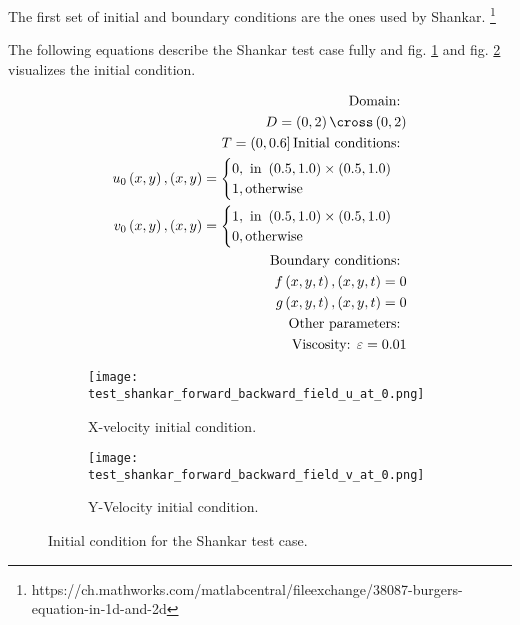 
The first set of initial and boundary conditions are the ones used by Shankar. \footnote{https://ch.mathworks.com/matlabcentral/fileexchange/38087-burgers-equation-in-1d-and-2d}

The following equations describe the Shankar test case fully and fig. \ref{fig:shankar_ic1} and fig. \ref{fig:shankar_ic2} visualizes the initial condition.

\begin{equation}
\begin{split}
\text{Domain: } \\
D = \left(0,2\right) \cross \left(0,2\right) \\
T = \left(0, 0.6\right]
\text{Initial conditions: } \\
u_0\left(x, y\right), \left(x, y\right) = \begin{cases}
0, \text{ in } \left(0.5, 1.0\right) \times \left(0.5, 1.0\right) \\
1, \text{otherwise}
\end{cases}
\\
v_0\left(x, y\right), \left(x, y\right) =  \begin{cases}
1, \text{ in } \left(0.5, 1.0\right) \times \left(0.5, 1.0\right) \\
0, \text{otherwise}
\end{cases}
\\
\text{Boundary conditions: } \\
f\left(x, y, t\right), \left(x, y, t\right) = 0 \\
g\left(x, y, t\right), \left(x, y, t\right) = 0 \\
\text{Other parameters: } \\
\text{Viscosity: } \varepsilon = 0.01
\end{split}
\end{equation}

\begin{figure}
\centering
\begin{subfigure}{.5\textwidth}
  \centering
  \texttt{[image: test\_shankar\_forward\_backward\_field\_u\_at\_0.png]}
  \caption{X-velocity initial condition.}
  \label{fig:shankar_ic1}
\end{subfigure}%
\begin{subfigure}{.5\textwidth}
  \centering
  \texttt{[image: test\_shankar\_forward\_backward\_field\_v\_at\_0.png]}
  \caption{Y-Velocity initial condition.}
  \label{fig:shankar_ic2}
\end{subfigure}
\caption{Initial condition for the Shankar test case.}
\label{fig:shankar_ic}
\end{figure}

